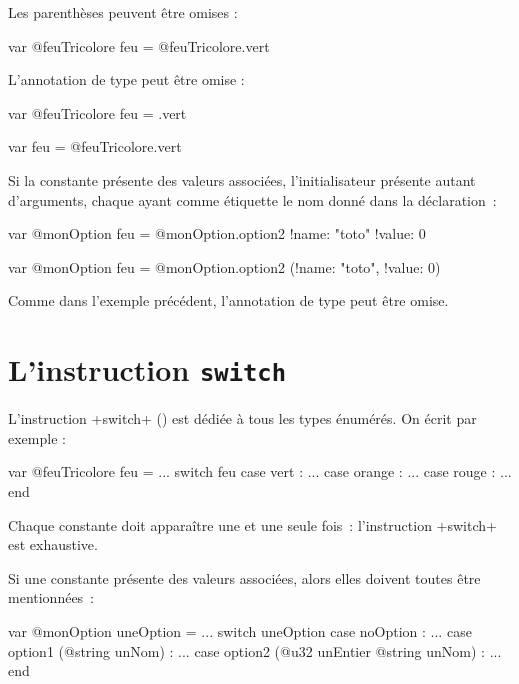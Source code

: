 Les parenthèses peuvent être omises :
\begin{galgas4}
var @feuTricolore feu = @feuTricolore.vert
\end{galgas4}

L'annotation de type peut être omise :

\begin{galgas4}
var @feuTricolore feu = .vert
\end{galgas4}

\begin{galgas4}
var feu = @feuTricolore.vert
\end{galgas4}


Si la constante présente des valeurs associées, l'initialisateur présente autant d'arguments, chaque ayant comme étiquette le nom donné dans la déclaration~:

\begin{galgas4}
var @monOption feu = @monOption.option2 {!name: "toto" !value: 0}
\end{galgas4}

\begin{galgas4}
var @monOption feu = @monOption.option2 (!name: "toto", !value: 0)
\end{galgas4}

Comme dans l'exemple précédent, l'annotation de type peut être omise.








\section{L'instruction \texttt{switch}}

L'instruction \ggsq+switch+ () est dédiée à tous les types énumérés. On écrit par exemple :

\begin{galgas4}
var @feuTricolore feu = ...
switch feu
case vert : ...
case orange : ...
case rouge : ...
end
\end{galgas4}

Chaque constante doit apparaître une et une seule fois~: l'instruction \ggsq+switch+ est exhaustive.

Si une constante présente des valeurs associées, alors elles doivent toutes être mentionnées~:

\begin{galgas4}
var @monOption uneOption = ...
switch uneOption
case noOption : ...
case option1 (@string unNom) : ...
case option2 (@u32 unEntier @string unNom) : ...
end
\end{galgas4}

